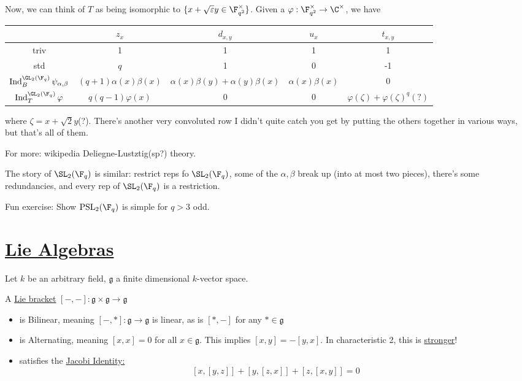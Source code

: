 \documentclass[x11names,reqno,14pt]{extarticle}
\newcommand{\mk}[1]{\mathfrak{#1}}
\newcommand{\g}{\mk{g}}
\DeclareMathOperator{\Ind}{Ind}
\DeclareMathOperator{\PSL}{PSL}
\begin{document}
Now, we can think of $T$ as being isomorphic to $\{x + \sqrt{\varepsilon}y \in \F_{q^2}^\times\}$. Given a $\varphi:\F_{q^2}^\times\to\C^\times$, we have
\begin{center}
\begin{tabular}{c| c c c c}
\, &$z_x$ & $d_{x, y}$ & $u_x$ & $t_{x,y}$ \\
\hline
triv & 1 & 1 & 1 & 1 \\
std & $q$ & 1 & 0 & -1 \\
$\Ind_B^{\GL_2(\F_q)}\psi_{\alpha,\beta}$ & $(q+1)\alpha(x)\beta(x)$ & $\alpha(x)\beta(y) + \alpha(y)\beta(x)$ & $\alpha(x)\beta(x)$ & 0 \\
$\Ind_T^{\GL_2(\F_q)}\varphi$ & $q(q-1)\varphi(x)$ & 0 & 0 & $\varphi(\zeta) + \varphi(\zeta)^q(?)$
\end{tabular}
\end{center}
where $\zeta = x + \sqrt{2}y$(?). There's another very convoluted row I didn't quite catch you get by putting the others together in various ways, but that's all of them. 

For more: wikipedia Deliegne-Lustztig(sp?) theory.

The story of $\SL_2(\F_q)$ is similar: restrict reps fo $\SL_2(\F_q)$, some of the $\alpha,\beta$ break up (into at most two pieces), there's some redundancies, and every rep of $\SL_2(\F_q)$ is a restriction. 

Fun exercise: Show $\PSL_2(\F_q)$ is simple for $q > 3$ odd.

\section*{\underline{Lie Algebras}}

Let $k$ be an arbitrary field, $\g$ a finite dimensional $k$-vector space. 


A \underline{Lie bracket} $[-,-]:\g\times\g\to\g$  
\begin{itemize}

\item is Bilinear, meaning $[-,*]:\g\to\g$ is linear, as is $[*,-]$ for any $*\in\g$

\item is Alternating, meaning $[x,x] = 0$ for all $x \in \g$. This implies $[x,y]=-[y,x]$. In characteristic 2, this is \underline{stronger}!

\item satisfies the \underline{Jacobi Identity:}
\[
[x,[y,z]] + [y,[z,x]] + [z, [x, y]] = 0
\]

\end{itemize}
\end{document}
